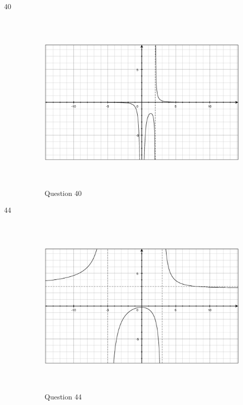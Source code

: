 \documentclass[fleqn,addpoints]{exam}
\begin{document}
\begin{description}
\item[40]
\begin{figure}[H]
  \centering
  \includegraphics[width=12.25cm,height=8.75cm]{question40.eps}
  \caption*{Question 40}
\end{figure}

\item[44]
\begin{figure}[H]
  \centering
  \includegraphics[width=12.25cm,height=8.75cm]{question44.eps}
  \caption*{Question 44}
\end{figure}


\end{description}
\end{document}
